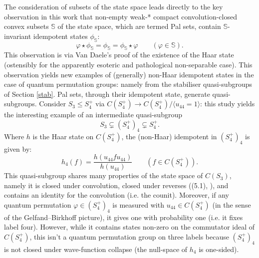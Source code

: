 \documentclass[12pt]{amsart}
\theoremstyle{remark}
\theoremstyle{remark}
\begin{document}
The consideration of subsets of the state space leads directly to the key observation in this work that non-empty weak-* compact convolution-closed convex subsets $\mathbb{S}$ of the state space, which are termed Pal sets, contain $\mathbb{S}$-invariant idempotent states $\phi_{\mathbb{S}}$:
$$\varphi\star \phi_{\mathbb{S}}=\phi_{\mathbb{S}}=\phi_{\mathbb{S}}\star \varphi\qquad (\varphi\in\mathbb{S}).$$
  This observation is via Van Daele's proof of the existence of the Haar state \cite{van} (ostensibly for the apparently esoteric and pathological non-separable case).   This observation yields new examples of (generally) non-Haar idempotent states in the case of quantum permutation groups: namely from the stabiliser quasi-subgroups of Section \ref{stab}. Pal sets, through their idempotent state, generate quasi-subgroups. Consider $S_3\leq S_4^+$ via $C(S_4^+)\to C(S_4^+)/\langle u_{44}=1\rangle$: this study yields the interesting example of an intermediate quasi-subgroup
  $$S_3\subsetneq (S_4^+)_4\subsetneq S_4^+.$$ Where $h$ is the Haar state on $C(S_4^+)$, the (non-Haar) idempotent in $(S_4^+)_4$ is given by:
   $$h_4(f)=\frac{h(u_{44}fu_{44})}{h(u_{44})}\qquad (f\in C(S_4^+)).$$
   This quasi-subgroup shares many properties of the state space of $C(S_3)$, namely it is closed under convolution, closed under reverses ((5.1), \cite{mcc}), and contains an identity for the convolution (i.e. the counit). Moreover, if any quantum permutation $\varphi\in (S_4^+)_4$ is measured with $u_{44}\in C(S_4^+)$ (in the sense of the Gelfand--Birkhoff picture), it gives one with probability one (i.e. it fixes label four). However, while it contains states non-zero on the commutator ideal of $C(S_4^+)$, this isn't a quantum permutation group on three labels because $(S_4^+)_4$ is not closed under wave-function collapse (the null-space of $h_4$ is one-sided).



\bigskip
\end{document}
